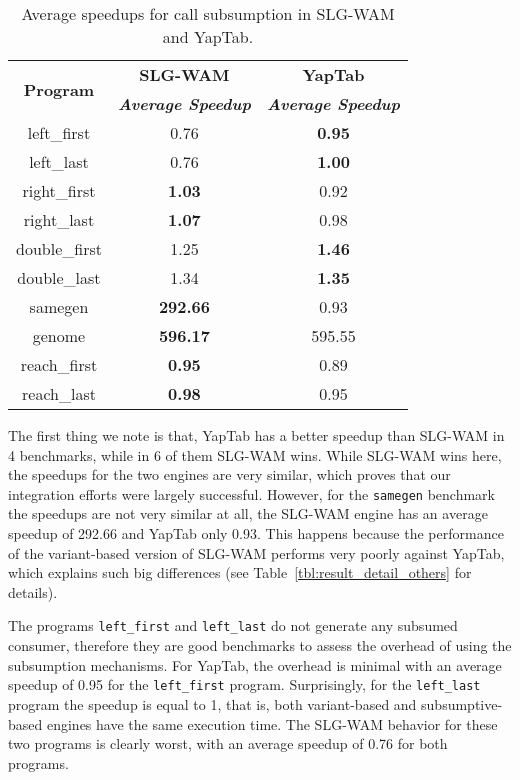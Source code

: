 \begin{table}[ht]
\centering
  \begin{tabular}{ccc}
   \hline
    \hline
    \multirow{2}{*}{\textbf{Program}} & \textbf{SLG-WAM} & \textbf{YapTab} \\
    & \textbf{\textit{\small{Average Speedup}}} & \textbf{\textit{\small{Average Speedup}}} \\
   \hline
   \hline
left\_first & 0.76 & \textbf{0.95} \\
left\_last & 0.76  & \textbf{1.00} \\
right\_first & \textbf{1.03} & 0.92 \\
right\_last & \textbf{1.07} & 0.98 \\
double\_first & 1.25 & \textbf{1.46} \\
double\_last & 1.34 & \textbf{1.35} \\
samegen & \textbf{292.66} & 0.93 \\
genome & \textbf{596.17} & 595.55 \\
reach\_first  & \textbf{0.95} & 0.89 \\
reach\_last  & \textbf{0.98} & 0.95 \\
\hline
\hline
\end{tabular}
\caption{Average speedups for call subsumption in SLG-WAM and YapTab.}
\label{tbl:results_overview}
\end{table}

The first thing we note is that,  YapTab has a better speedup than SLG-WAM in 4 benchmarks, while in 6 of
them SLG-WAM wins. While SLG-WAM wins here, the speedups for the two engines are very similar, which proves
that our integration efforts were  largely successful. However, for the \texttt{samegen} benchmark the
speedups are not very similar at all, the SLG-WAM engine has an average speedup of 292.66
and YapTab only 0.93. This happens because the performance of the variant-based version of SLG-WAM
performs very poorly against YapTab, which explains such big differences (see Table~\ref{tbl:result_detail_others}
for details).

The programs \texttt{left\_first} and \texttt{left\_last} do not generate any subsumed consumer,
therefore they are good benchmarks to assess the overhead of using the subsumption mechanisms. For YapTab,
the overhead is minimal with an average speedup of 0.95 for the \texttt{left\_first} program. Surprisingly, for the
\texttt{left\_last} program the speedup is equal to 1, that is, both variant-based and subsumptive-based
engines have the same execution time. The SLG-WAM behavior for these two programs is clearly worst, with an average
speedup of 0.76 for both programs.

